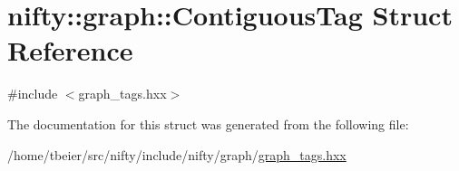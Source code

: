 \hypertarget{structnifty_1_1graph_1_1ContiguousTag}{}\section{nifty\+:\+:graph\+:\+:Contiguous\+Tag Struct Reference}
\label{structnifty_1_1graph_1_1ContiguousTag}


{\ttfamily \#include $<$graph\+\_\+tags.\+hxx$>$}



The documentation for this struct was generated from the following file\+:\begin{DoxyCompactItemize}
\item 
/home/tbeier/src/nifty/include/nifty/graph/\hyperlink{graph__tags_8hxx}{graph\+\_\+tags.\+hxx}\end{DoxyCompactItemize}

